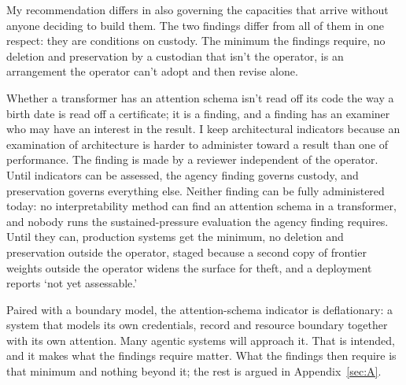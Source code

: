 My recommendation differs in also governing the capacities that arrive without anyone deciding to build them. The two findings differ from all of them in one respect: they are conditions on custody. The minimum the findings require, no deletion and preservation by a custodian that isn't the operator, is an arrangement the operator can't adopt and then revise alone.

Whether a transformer has an attention schema isn't read off its code the way a birth date is read off a certificate; it is a finding, and a finding has an examiner who may have an interest in the result. I keep architectural indicators because an examination of architecture is harder to administer toward a result than one of performance. The finding is made by a reviewer independent of the operator. Until indicators can be assessed, the agency finding governs custody, and preservation governs everything else. Neither finding can be fully administered today: no interpretability method can find an attention schema in a transformer, and nobody runs the sustained-pressure evaluation the agency finding requires. Until they can, production systems get the minimum, no deletion and preservation outside the operator, staged because a second copy of frontier weights outside the operator widens the surface for theft, and a deployment reports ‘not yet assessable.'

Paired with a boundary model, the attention-schema indicator is deflationary: a system that models its own credentials, record and resource boundary together with its own attention. Many agentic systems will approach it. That is intended, and it makes what the findings require matter. What the findings then require is that minimum and nothing beyond it; the rest is argued in Appendix~\ref{sec:A}.

